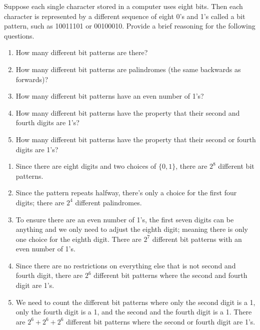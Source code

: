 \documentclass{article}
\theoremstyle{definition}
\begin{document}
\begin{question}
    Suppose each single character stored in a computer uses eight bits. 
    Then each character is represented by a different sequence of eight 0's and 1's called a bit pattern, 
    such as 10011101 or 00100010. Provide a brief reasoning for the following questions.
        \begin{enumerate}
            \item How many different bit patterns are there?
            \item How many different bit patterns are palindromes (the same backwards as forwards)?
            \item How many different bit patterns have an even number of 1's?
            \item How many different bit patterns have the property that their second and fourth digits are 1's?
            \item How many different bit patterns have the property that their second or fourth digits are 1's?
        \end{enumerate}
\end{question}
\begin{solution}
    \begin{enumerate}
        \item Since there are eight digits and two choices of $\{0, 1\}$, there are $2^8$ different bit patterns. 
        \item Since the pattern repeats halfway, there's only a choice for the first four digits; there are $2^4$ different palindromes.
        \item To ensure there are an even number of 1's, the first seven digits can be anything and we only need to adjust the eighth digit; meaning there is only one choice for the eighth digit. There are $2^7$ different bit patterns with an even number of 1's.
        \item Since there are no restrictions on everything else that is not second and fourth digit, there are $2^6$ different bit patterns where the second and fourth digit are 1's.
        \item We need to count the different bit patterns where only the second digit is a 1, only the fourth digit is a 1, and the second and the fourth digit is a 1. There are $2^6+2^6+2^6$ different bit patterns where the second or fourth digit are 1's.
    \end{enumerate}
\end{solution}
\end{document}
